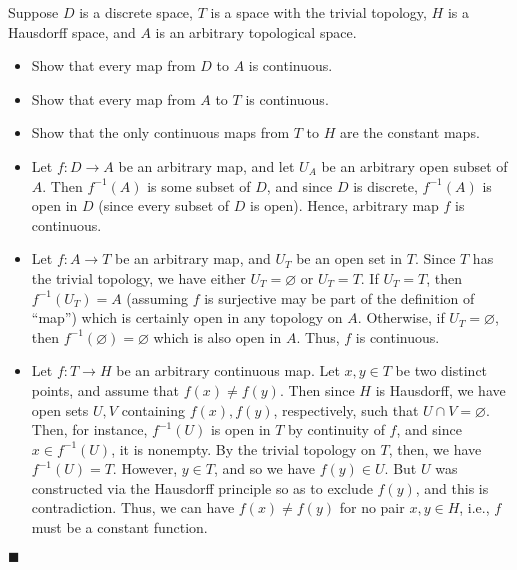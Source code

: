 \documentclass[12pt]{article}
\renewcommand{\qed}{\hfill$\blacksquare$}
\renewenvironment{proof}{\begin{addmargin}[1em]{0em}\begin{newproof}}{\end{newproof}\end{addmargin}\qed}
\newenvironment{problem}[2][Problem]{\begin{trivlist}
\item[\hskip \labelsep {\bfseries #1}\hskip \labelsep {\bfseries #2.}]}{\end{trivlist}}
\begin{document}
\begin{problem}{2-9}
Suppose $D$ is a discrete space, $T$ is a space with the trivial topology, $H$ is a Hausdorff space, and $A$ is an arbitrary topological space.
\begin{itemize}
	\item Show that every map from $D$ to $A$ is continuous.
	\item Show that every map from $A$ to $T$ is continuous.
	\item Show that the only continuous maps from $T$ to $H$ are the constant maps.
\end{itemize}
\end{problem}
\begin{proof}
\begin{itemize}
	\item Let $f:D\rightarrow A$ be an arbitrary map, and let $U_A$ be an arbitrary open subset of $A$. Then $f^{-1}\left(A\right)$ is some subset of $D$, and since $D$ is discrete, $f^{-1}\left(A\right)$ is open in $D$ (since every subset of $D$ is open). Hence, arbitrary map $f$ is continuous.
	\item Let $f:A\rightarrow T$ be an arbitrary map, and $U_T$ be an open set in $T$. Since $T$ has the trivial topology, we have either $U_T=\varnothing$ or $U_T=T$. If $U_T=T$, then $f^{-1}\left(U_T\right) = A$ {\color{red}(assuming $f$ is surjective may be part of the definition of ``map'')} which is certainly open in any topology on $A$. Otherwise, if $U_T=\varnothing$, then $f^{-1}\left(\varnothing\right) = \varnothing$ which is also open in $A$. Thus, $f$ is continuous.
	\item Let $f:T\rightarrow H$ be an arbitrary continuous map. Let $x,y\in T$ be two distinct points, and assume that $f\left(x\right)\neq f\left(y\right)$. Then since $H$ is Hausdorff, we have open sets $U,V$ containing $f\left(x\right),f\left(y\right)$, respectively, such that $U\cap V = \varnothing$. Then, for instance, $f^{-1}\left(U\right)$ is open in $T$ by continuity of $f$, and since $x \in f^{-1}\left(U\right)$, it is nonempty. By the trivial topology on $T$, then, we have $f^{-1}\left(U\right)=T$. However, $y\in T$, and so we have $f\left(y\right)\in U$. But $U$ was constructed via the Hausdorff principle so as to exclude $f\left(y\right)$, and this is contradiction. Thus, we can have $f\left(x\right)\neq f\left(y\right)$ for no pair $x,y\in H$, i.e., $f$ must be a constant function.
\end{itemize}
\end{proof}
\end{document}
